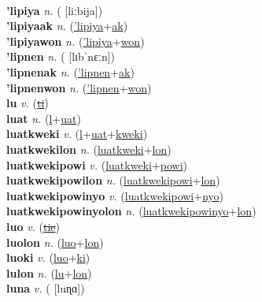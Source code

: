  \label{lip} \\
\textbf{'lipiya} \textit{n.} ( [liːbija])
 \label{'lipiya} \\
\textbf{'lipiyaak} \textit{n.} (\hyperref['lipiya]{'lipiya}+\hyperref[ak]{ak})
 \label{'lipiyaak} \\
\textbf{'lipiyawon} \textit{n.} (\hyperref['lipiya]{'lipiya}+\hyperref[won]{won})
 \label{'lipiyawon} \\
\textbf{'lipnen} \textit{n.} ( [lɪbˈnɛːn])
 \label{'lipnen} \\
\textbf{'lipnenak} \textit{n.} (\hyperref['lipnen]{'lipnen}+\hyperref[ak]{ak})
 \label{'lipnenak} \\
\textbf{'lipnenwon} \textit{n.} (\hyperref['lipnen]{'lipnen}+\hyperref[won]{won})
 \label{'lipnenwon} \\
\textbf{lu} \textit{v.} (\hyperref[ti]{\sout{ti}})
 \label{lu} \\
\textbf{luat} \textit{n.} (\hyperref[l]{l}+\hyperref[uat]{uat})
 \label{luat} \\
\textbf{luatkweki} \textit{v.} (\hyperref[l]{l}+\hyperref[uat]{uat}+\hyperref[kweki]{kweki})
 \label{luatkweki} \\
\textbf{luatkwekilon} \textit{n.} (\hyperref[luatkweki]{luatkweki}+\hyperref[lon]{lon})
 \label{luatkwekilon} \\
\textbf{luatkwekipowi} \textit{v.} (\hyperref[luatkweki]{luatkweki}+\hyperref[powi]{powi})
 \label{luatkwekipowi} \\
\textbf{luatkwekipowilon} \textit{n.} (\hyperref[luatkwekipowi]{luatkwekipowi}+\hyperref[lon]{lon})
 \label{luatkwekipowilon} \\
\textbf{luatkwekipowinyo} \textit{v.} (\hyperref[luatkwekipowi]{luatkwekipowi}+\hyperref[nyo]{nyo})
 \label{luatkwekipowinyo} \\
\textbf{luatkwekipowinyolon} \textit{n.} (\hyperref[luatkwekipowinyo]{luatkwekipowinyo}+\hyperref[lon]{lon})
 \label{luatkwekipowinyolon} \\
\textbf{luo} \textit{v.} (\hyperref[tie]{\sout{tie}})
 \label{luo} \\
\textbf{luolon} \textit{n.} (\hyperref[luo]{luo}+\hyperref[lon]{lon})
 \label{luolon} \\
\textbf{luoki} \textit{v.} (\hyperref[luo]{luo}+\hyperref[ki]{ki})
 \label{luoki} \\
\textbf{lulon} \textit{n.} (\hyperref[lu]{lu}+\hyperref[lon]{lon})
 \label{lulon} \\
\textbf{luna} \textit{v.} ( [luɳɑ])
